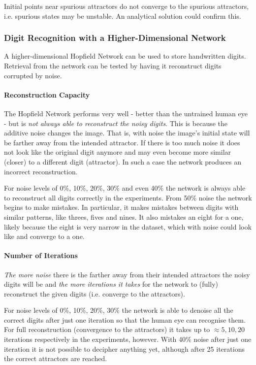 Initial points near spurious attractors do not converge to the spurious attractors,
i.e. spurious states may be unstable. An analytical solution could confirm this.

\subsubsection{Digit Recognition with a Higher-Dimensional Network}

A higher-dimensional Hopfield Network can be used to store handwritten digits.
Retrieval from the network can be tested by having it reconstruct digits corrupted by noise.

\paragraph{Reconstruction Capacity}

The Hopfield Network performs very well - better than the untrained human eye -
but is \textit{not always able to reconstruct the noisy digits}.
This is because the additive noise changes the image.
That is, with noise the image's initial state will be farther away from the intended attractor.
If there is too much noise it does not look like the original digit anymore
and may even become more similar (closer) to a different digit (attractor).
In such a case the network produces an incorrect reconstruction.

For noise levels of 0\%, 10\%, 20\%, 30\% and even 40\% the network is always able to reconstruct all digits correctly in the experiments.
From 50\% noise the network begins to make mistakes.
In particular, it makes mistakes between digits with similar patterns, like threes, fives and nines.
It also mistakes an eight for a one, likely because the eight is very narrow in the dataset, which with noise could look like and converge to a one.

\paragraph{Number of Iterations}

\textit{The more noise} there is the farther away from their intended attractors the noisy digits will be
and \textit{the more iterations it takes} for the network to (fully) reconstruct the given digits (i.e. converge to the attractors).

For noise levels of 0\%, 10\%, 20\%, 30\% the network is able to denoise all the correct digits after just one iteration so that the human eye can recognise them.
For full reconstruction (convergence to the attractors) it takes up to $\approx 5, 10, 20$ iterations respectively in the experiments, however.
With 40\% noise after just one iteration it is not possible to decipher anything yet, although after 25 iterations the correct attractors are reached.

